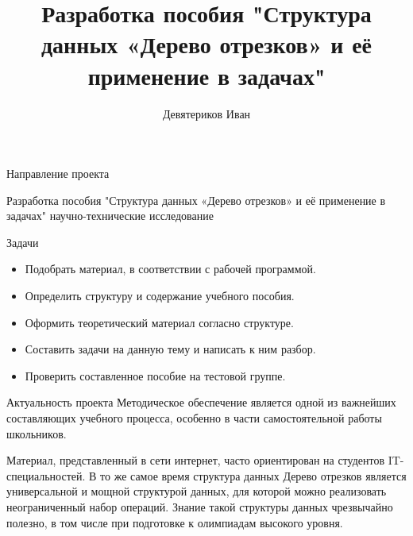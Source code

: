 \documentclass[8pt]{beamer}%
\title{Разработка пособия "Структура данных «Дерево отрезков» и её применение в задачах"}
\author{Девятериков Иван}
\begin{document}
	
	\begin{frame}%
		\titlepage
	\end{frame}
	
	\begin{frame}{Направление проекта}
		\begin{block}{Разработка пособия "Структура данных «Дерево отрезков» и её применение в задачах"}
			научно-технические исследование
		\end{block}
		
		
		\begin{block}{Задачи}
			\begin{itemize}
				\item Подобрать материал, в соответствии с рабочей программой.
				\item Определить структуру и содержание учебного пособия.
				\item Оформить теоретический материал согласно структуре.
				\item Составить задачи на данную тему и написать к ним разбор.
				\item Проверить составленное пособие на тестовой группе.
			\end{itemize}
		\end{block}
	
	\end{frame}

	\begin{frame}{Актуальность проекта}
		Методическое обеспечение является одной из важнейших составляющих учебного процесса, особенно в части самостоятельной работы школьников.
		
		Материал, представленный в сети интернет, часто ориентирован на студентов IT-специальностей. В то же самое время структура данных Дерево отрезков является универсальной и мощной структурой данных, для которой можно реализовать неограниченный набор операций. Знание такой структуры данных чрезвычайно полезно, в том числе при подготовке к олимпиадам высокого уровня.
		
	\end{frame}
\end{document}
